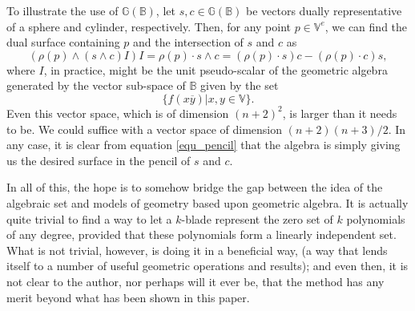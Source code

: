 \documentclass{birkjour}
\theoremstyle{definition}
\theoremstyle{remark}
\numberwithin{equation}{section}
\newcommand{\G}{\mathbb{G}}
\newcommand{\V}{\mathbb{V}}
\newcommand{\B}{\mathbb{B}}
\begin{document}
To illustrate the use of $\G(\B)$, let $s,c\in\G(\B)$ be vectors dually representative
of a sphere and cylinder, respectively.  Then, for any point $p\in\V^e$, we can find
the dual surface containing $p$ and the intersection of $s$ and $c$ as
\begin{equation}\label{equ_pencil}
(\rho(p)\wedge(s\wedge c)I)I = \rho(p)\cdot s\wedge c = (\rho(p)\cdot s)c - (\rho(p)\cdot c)s,
\end{equation}
where $I$, in practice, might be the unit pseudo-scalar of the geometric algebra
generated by the vector sub-space of $\B$ given by the set
\begin{equation}
\{f(x\overline{y})|x,y\in\V\}.
\end{equation}
Even this vector space, which is of dimension $(n+2)^2$, is larger than it needs to be.
We could suffice with a vector space of dimension $(n+2)(n+3)/2$.
In any case, it is clear from equation \eqref{equ_pencil} that the algebra
is simply giving us the desired surface in the pencil of $s$ and $c$.

In all of this, the hope is to somehow bridge the gap between
the idea of the algebraic set and models of geometry based
upon geometric algebra.  It is actually quite trivial to find a way
to let a $k$-blade represent the zero set of $k$ polynomials of any degree,
provided that these polynomials form a linearly independent set.  What is
not trivial, however, is doing it in a beneficial way, (a way that lends itself to a number
of useful geometric operations and results); and even then, it is not clear
to the author, nor perhaps will it ever be, that the method has any
merit beyond what has been shown in this paper.

\nocite{Dorst07}



\end{document}
